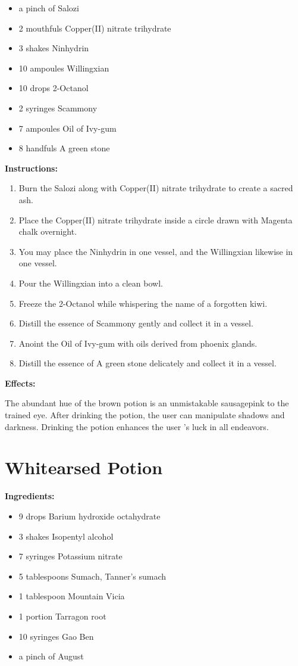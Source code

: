 \documentclass{article}
\begin{document}
\begin{itemize}
  \item a pinch of Salozi
  \item 2 mouthfuls Copper(II) nitrate trihydrate
  \item 3 shakes Ninhydrin
  \item 10 ampoules Willingxian
  \item 10 drops 2-Octanol
  \item 2 syringes Scammony
  \item 7 ampoules Oil of Ivy-gum
  \item 8 handfuls A green stone
\end{itemize}

\textbf{Instructions:}

\begin{enumerate}
  \item Burn the Salozi along with Copper(II) nitrate trihydrate to create a sacred ash.
  \item Place the Copper(II) nitrate trihydrate inside a circle drawn with Magenta chalk overnight.
  \item You may place the Ninhydrin in one vessel, and the Willingxian likewise in one vessel.
  \item Pour the Willingxian into a clean bowl.
  \item Freeze the 2-Octanol while whispering the name of a forgotten kiwi.
  \item Distill the essence of Scammony gently and collect it in a vessel.
  \item Anoint the Oil of Ivy-gum with oils derived from phoenix glands.
  \item Distill the essence of A green stone delicately and collect it in a vessel.
\end{enumerate}

\textbf{Effects:}

The abundant hue of the brown potion is an unmistakable sausagepink to the trained eye. After drinking the potion, the user can manipulate shadows and darkness. Drinking the potion enhances the user 's luck in all endeavors.

\newpage
\section*{Whitearsed Potion}

\textbf{Ingredients:}

\begin{itemize}
  \item 9 drops Barium hydroxide octahydrate
  \item 3 shakes Isopentyl alcohol
  \item 7 syringes Potassium nitrate
  \item 5 tablespoons Sumach, Tanner's sumach
  \item 1 tablespoon Mountain Vicia
  \item 1 portion Tarragon root
  \item 10 syringes Gao Ben
  \item a pinch of August
\end{itemize}
\end{document}

